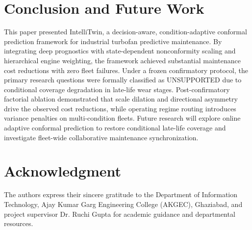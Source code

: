 \documentclass[conference,a4paper]{IEEEtran}
\begin{document}
\section{Conclusion and Future Work}

This paper presented IntelliTwin, a decision-aware, condition-adaptive conformal prediction framework for industrial turbofan predictive maintenance. By integrating deep prognostics with state-dependent nonconformity scaling and hierarchical engine weighting, the framework achieved substantial maintenance cost reductions with zero fleet failures. Under a frozen confirmatory protocol, the primary research questions were formally classified as UNSUPPORTED due to conditional coverage degradation in late-life wear stages. Post-confirmatory factorial ablation demonstrated that scale dilation and directional asymmetry drive the observed cost reductions, while operating regime routing introduces variance penalties on multi-condition fleets. Future research will explore online adaptive conformal prediction to restore conditional late-life coverage and investigate fleet-wide collaborative maintenance synchronization.

\section*{Acknowledgment}
The authors express their sincere gratitude to the Department of Information Technology, Ajay Kumar Garg Engineering College (AKGEC), Ghaziabad, and project supervisor Dr. Ruchi Gupta for academic guidance and departmental resources.



\end{document}
